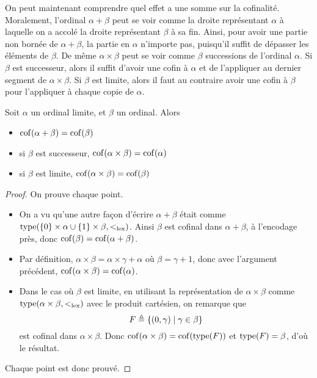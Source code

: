 On peut maintenant comprendre quel effet a une somme sur la cofinalité.
Moralement, l'ordinal $\alpha + \beta$ peut se voir comme la droite représentant
$\alpha$ à laquelle on a accolé la droite représentant $\beta$ à sa fin. Ainsi,
pour avoir une partie non bornée de $\alpha + \beta$, la partie en $\alpha$
n'importe pas, puisqu'il suffit de dépasser les éléments de $\beta$. De même
$\alpha \times \beta$ peut se voir comme $\beta$ successions de l'ordinal
$\alpha$. Si $\beta$ est successeur, alors il suffit d'avoir une cofin à
$\alpha$ et de l'appliquer au dernier segment de $\alpha\times\beta$. Si
$\beta$ est limite, alors il faut au contraire avoir une cofin à $\beta$ pour
l'appliquer à chaque copie de $\alpha$.

\begin{proposition}\label{prop.cof.oper}
  Soit $\alpha$ un ordinal limite, et $\beta$ un ordinal. Alors
  \begin{itemize}
  \item $\operatorname{cof}(\alpha + \beta) = \operatorname{cof}(\beta)$
  \item si $\beta$ est successeur, $\operatorname{cof}(\alpha \times \beta) = \operatorname{cof}(\alpha)$
  \item si $\beta$ est limite, $\operatorname{cof}(\alpha\times\beta) = \operatorname{cof}(\beta)$
  \end{itemize}
\end{proposition}

\begin{proof}
  On prouve chaque point.
  \begin{itemize}
  \item On a vu qu'une autre façon d'écrire $\alpha + \beta$ était comme
    $\operatorname{type}(\{0\}\times\alpha \cup \{1\}\times\beta, <_{\mathrm{lex}})$. Ainsi $\beta$ est
    cofinal dans $\alpha + \beta$, à l'encodage près, donc
    $\operatorname{cof}(\beta) = \operatorname{cof}(\alpha + \beta)$.
  \item Par définition, $\alpha \times \beta = \alpha \times \gamma + \alpha$
    où $\beta = \gamma + 1$, donc avec l'argument précédent,
    $\operatorname{cof}(\alpha\times\beta) = \operatorname{cof}(\alpha)$.
  \item Dans le cas où $\beta$ est limite, en utilisant la représentation de
    $\alpha \times \beta$ comme $\operatorname{type}(\alpha\times\beta,<_{\mathrm{lex}})$ avec le produit
    cartésien, on remarque que
    \[F \triangleq \{(0,\gamma) \mid \gamma \in \beta\}\]
    est cofinal dans $\alpha \times \beta$. Donc
    $\operatorname{cof}(\alpha\times \beta) = \operatorname{cof}(\operatorname{type}(F))$ et $\operatorname{type}(F) = \beta$, d'où le
    résultat.
  \end{itemize}
  Chaque point est donc prouvé.
\end{proof}

